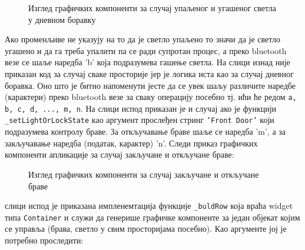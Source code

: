 \documentclass[12pt]{article}
\begin{document}
\begin{figure}[H]
\centering
{}
\hfill %
\caption{Изглед графичких компоненти за случај упаљеног и угашеног светла у дневном боравку}
\end{figure}
Ако променљиве не указују на то да је светло упаљено то значи да је светло угашено и да га треба упалити па се ради супротан процес, а преко bluetooth везе се шаље наредба 'b' која подразумева гашење светла. На слици изнад није приказан код за случај сваке просторије јер је логика иста као за случај дневног боравка. Оно што је битно напоменути јесте да се увек шаљу различите наредбе (карактери) преко bluetooth везе за сваку операцију посебно тј. ићи ће редом \texttt{a, b, c, d, ..., m, n}. На слици испод приказан је и случај ако је функцији \texttt{\_setLightOrLockState} као аргумент прослеђен стринг \texttt{'Front Door'} који подразумева контролу браве. За откључавање браве шаље се наредба 'm', а за закључавање наредба (податак, карактер) 'n'. Следи приказ графичких компоненти апликације за случај закључане и откључане браве:
\begin{figure}[H]
\centering
{}
\hfill %
\caption{Изглед графичких компоненти за случај закључане и откључане браве}
\end{figure}
\vspace{0.5cm}
\indent{} слици испод је приказана импленемтација функције \texttt{\_buldRow} која враћа widget типа \texttt{Container} и служи да генерише графичке компоненте за један објекат којим се управља (брава, светло у свим просторијама посебно). Као аргументе јој је потребно проследити:
\end{document}
